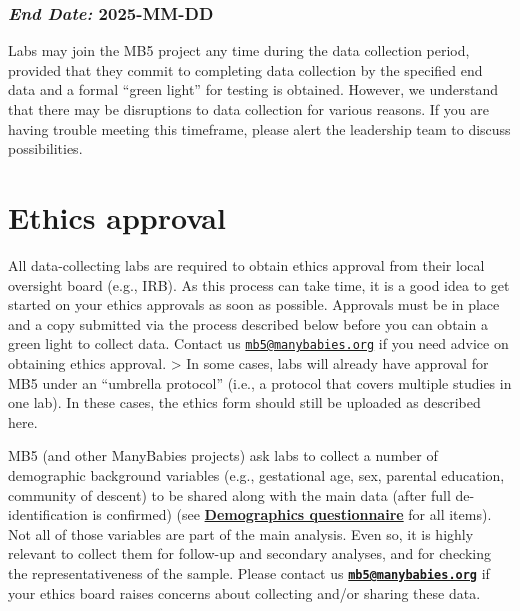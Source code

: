\documentclass[
]{book}
\begin{document}
\subsubsection*{\texorpdfstring{\emph{End Date:} \textbf{2025-MM-DD}}{End Date: 2025-MM-DD}}\label{end-date-2025-mm-dd}

Labs may join the MB5 project any time during the data collection period, provided that they commit to completing data collection by the specified end data and a formal ``green light'' for testing is obtained. However, we understand that there may be disruptions to data collection for various reasons. If you are having trouble meeting this timeframe, please alert the leadership team to discuss possibilities.

\section{Ethics approval}\label{ethics-approval}

All data-collecting labs are required to obtain ethics approval from their local oversight board (e.g., IRB). As this process can take time, it is a good idea to get started on your ethics approvals as soon as possible. Approvals must be in place and a copy submitted via the process described below before you can obtain a green light to collect data. Contact us \href{mailto:mb5@manybabies.org}{\nolinkurl{mb5@manybabies.org}} if you need advice on obtaining ethics approval.
\textgreater{} In some cases, labs will already have approval for MB5 under an ``umbrella protocol'' (i.e., a protocol that covers multiple studies in one lab). In these cases, the ethics form should still be uploaded as described here.

MB5 (and other ManyBabies projects) ask labs to collect a number of demographic background variables (e.g., gestational age, sex, parental education, community of descent) to be shared along with the main data (after full de-identification is confirmed) (see \textbf{\href{ADD\%20LINK\%20TO\%20DEMOGRAPHICS\%20QUESTIONNAIRE}{Demographics questionnaire}} for all items). Not all of those variables are part of the main analysis. Even so, it is highly relevant to collect them for follow-up and secondary analyses, and for checking the representativeness of the sample. Please contact us \textbf{\href{mailto:mb5@manybabies.org}{\nolinkurl{mb5@manybabies.org}}} if your ethics board raises concerns about collecting and/or sharing these data.
\end{document}
